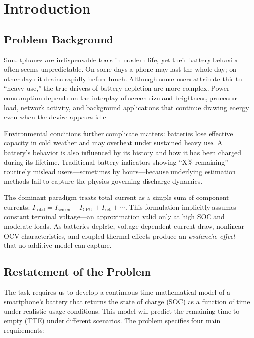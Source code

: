 \documentclass{mcmthesis}
\begin{document}
\tableofcontents
\newpage


\section{Introduction}
\label{sec:introduction}

\subsection{Problem Background}

Smartphones are indispensable tools in modern life, yet their battery behavior often seems unpredictable. On some days a phone may last the whole day; on other days it drains rapidly before lunch. Although some users attribute this to ``heavy use,'' the true drivers of battery depletion are more complex. Power consumption depends on the interplay of screen size and brightness, processor load, network activity, and background applications that continue drawing energy even when the device appears idle.

Environmental conditions further complicate matters: batteries lose effective capacity in cold weather and may overheat under sustained heavy use. A battery's behavior is also influenced by its history and how it has been charged during its lifetime. Traditional battery indicators showing ``X\% remaining'' routinely mislead users---sometimes by hours---because underlying estimation methods fail to capture the physics governing discharge dynamics.

The dominant paradigm treats total current as a simple sum of component currents: $I_{\mathrm{total}} = I_{\mathrm{screen}} + I_{\mathrm{CPU}} + I_{\mathrm{net}} + \cdots$. This formulation implicitly assumes constant terminal voltage---an approximation valid only at high SOC and moderate loads. As batteries deplete, voltage-dependent current draw, nonlinear OCV characteristics, and coupled thermal effects produce an \emph{avalanche effect} that no additive model can capture.

\subsection{Restatement of the Problem}

The task requires us to develop a continuous-time mathematical model of a smartphone's battery that returns the state of charge (SOC) as a function of time under realistic usage conditions. This model will predict the remaining time-to-empty (TTE) under different scenarios. The problem specifies four main requirements:
\end{document}

